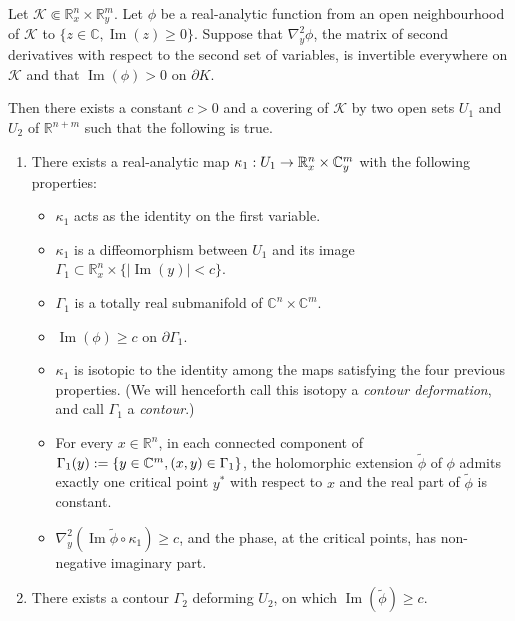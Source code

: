 \documentclass[AHL,Unicode,longabstracts,published]{cedram}
\DeclareMathOperator{\im}{Im}
\newcommand{\clK}{\mathcal{K}}
\newcommand\1{\mathds{1}}
\newcommand{\R}{\mathbb{R}}
\newcommand{\C}{\mathbb{C}}
\renewcommand*{\to}{\mathchoice{\longrightarrow}{\rightarrow}{\rightarrow}{\rightarrow}}
\begin{document}
\begin{prop}\label{prop:contour}
Let $\clK\Subset \R^n_x\times \R^m_y$. Let $\phi$ be a real-analytic function from an open neighbourhood of $\clK$ to $\{z\in \C,\im(z)\geq 0\}$. Suppose that $\nabla^2_y\phi$, the matrix of second derivatives with respect to the second set of variables, is invertible everywhere on $\clK$ and that $\im(\phi)>0$ on $\partial K$.

Then there exists a constant $c>0$ and a covering of $\clK$ by two open sets $U_1$ and $U_2$ of $\R^{n+m}$ such that the following is true.
\begin{enumerate}
\item\label{prop3.10.1} There exists a real-analytic map $\kappa_1:U_1\to \R^n_x\times \C^m_y$ with the following properties:
\begin{itemize}
\item $\kappa_1$ acts as the identity on the first variable.
\item $\kappa_1$ is a diffeomorphism between $U_1$ and its image $\Gamma_1\subset \R^n_x\times \{\lvert\im(y)|<c\}$.
\item $\Gamma_1$ is a totally real submanifold of $\C^n\times \C^m$.
\item $\im(\phi)\geq c$ on $\partial \Gamma_1$.
\item $\kappa_1$ is isotopic to the identity among the maps satisfying the four previous properties. (We will henceforth call this isotopy a \emph{contour deformation}, and call $\Gamma_1$ a \emph{contour}.)
\item For every $x\in \R^n$, in each connected component of $\Gamma_1(y):=\{y\in \C^m,\linebreak (x,y)\in \Gamma_1\}$, the holomorphic extension $\widetilde{\phi}$ of $\phi$ admits exactly one critical point $y^*$ with respect to $x$ and the real part of $\widetilde{\phi}$ is constant.
\item $\nabla^2_y(\im\widetilde{\phi}\circ \kappa_1)\geq c$, and the phase, at the critical points, has non-negative imaginary part.
\end{itemize}
\item\label{prop3.10.2} There exists a contour $\Gamma_2$ deforming $U_2$, on which $\im(\widetilde{\phi})\geq c$.
\end{enumerate}
\end{prop}
\end{document}
